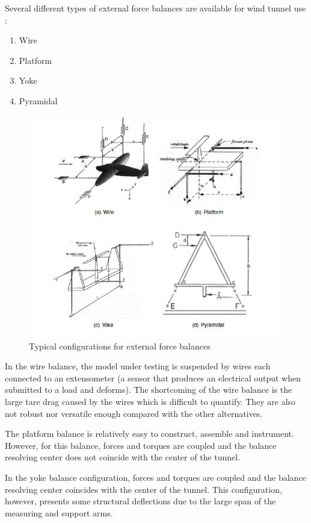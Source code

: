 Several different types of external force balances are available for wind tunnel use
\cite{morris_force_2010}:
\begin{enumerate}
\item Wire
\item Platform
\item Yoke
\item Pyramidal
\end{enumerate}
\begin{center}
	\begin{figure}[!h]
	\centering
	\includegraphics{Figures/Fig6}
	\caption[External Force balances]{Typical configurations for external force balances \cite{ferreira2015design}}
	\end{figure}
\end{center}
In the wire balance, the model under testing is suspended by wires each connected to an extensometer (a sensor that produces an electrical output when submitted to a load and deforms). The shortcoming of the wire balance is the large tare drag caused by the wires which is difficult to quantify. They are also not robust nor versatile enough compared with the other alternatives. 

The platform balance is relatively easy to construct, assemble and instrument. However, for this balance, forces and torques are coupled and the balance resolving center does not coincide with the center of the tunnel.
 
In the yoke balance configuration, forces and torques are coupled and the balance resolving center coincides with the center of the tunnel. This configuration, however, presents some structural deflections due to the large span of the measuring and support arms.

